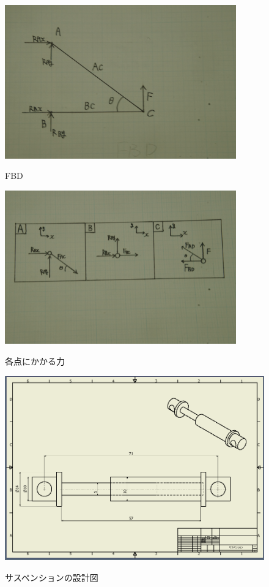 \documentclass[a4paper]{jarticle}
\begin{document}
\begin{figure}[htbt]
 \begin{center}
  \includegraphics[width=100mm]{img/fbd.jpg}
 　\caption{FBD}
  \label{fig:fbd}%
 \end{center}
\end{figure}


\begin{figure}[htbt]
 \begin{center}
  \includegraphics[width=100mm]{img/bai.jpg}
 　\caption{各点にかかる力}
  \label{fig:bai}%
 \end{center}
\end{figure}

\begin{figure}[htbt]
 \begin{center}
  \includegraphics[width=120mm]{img/saspention.png}
 　\caption{サスペンションの設計図}
  \label{fig:saspention}%
 \end{center}
\end{figure}
\end{document}
